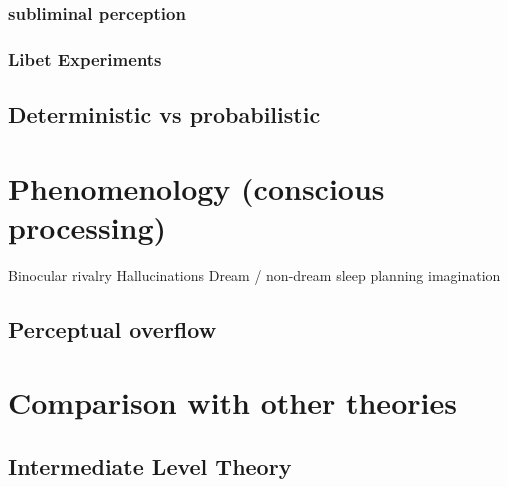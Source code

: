 \documentclass[utf8]{article}
\begin{document}
			\subsubsection{subliminal perception}
			
			\subsubsection{Libet Experiments}		
		
			
		\subsection{Deterministic vs probabilistic}
			\cite{dehaene2017consciousness}
			\cite{vul2008temporal, moreno2011bayesian, asplund2014attentional, vul2009attention}
			
			
	\section{Phenomenology (conscious processing)}
	
			
		Binocular rivalry
		Hallucinations
		Dream / non-dream sleep
		planning 
		imagination 
	
		\subsection{Perceptual overflow}
		
	\section{Comparison with other theories}
		\subsection{Intermediate Level Theory}
		
\end{document}
